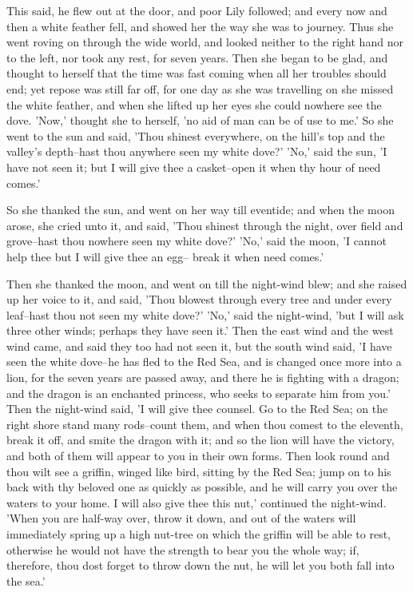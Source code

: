 \documentclass[12pt]{book}
\begin{document}
This said, he flew out at the door, and poor Lily followed; and every
now and then a white feather fell, and showed her the way she was to
journey. Thus she went roving on through the wide world, and looked
neither to the right hand nor to the left, nor took any rest, for
seven years. Then she began to be glad, and thought to herself that
the time was fast coming when all her troubles should end; yet repose
was still far off, for one day as she was travelling on she missed the
white feather, and when she lifted up her eyes she could nowhere see
the dove. 'Now,' thought she to herself, 'no aid of man can be of use
to me.' So she went to the sun and said, 'Thou shinest everywhere, on
the hill's top and the valley's depth--hast thou anywhere seen my
white dove?' 'No,' said the sun, 'I have not seen it; but I will give
thee a casket--open it when thy hour of need comes.'

So she thanked the sun, and went on her way till eventide; and when
the moon arose, she cried unto it, and said, 'Thou shinest through the
night, over field and grove--hast thou nowhere seen my white dove?'
'No,' said the moon, 'I cannot help thee but I will give thee an egg--
break it when need comes.'

Then she thanked the moon, and went on till the night-wind blew; and
she raised up her voice to it, and said, 'Thou blowest through every
tree and under every leaf--hast thou not seen my white dove?' 'No,'
said the night-wind, 'but I will ask three other winds; perhaps they
have seen it.' Then the east wind and the west wind came, and said
they too had not seen it, but the south wind said, 'I have seen the
white dove--he has fled to the Red Sea, and is changed once more into
a lion, for the seven years are passed away, and there he is fighting
with a dragon; and the dragon is an enchanted princess, who seeks to
separate him from you.' Then the night-wind said, 'I will give thee
counsel. Go to the Red Sea; on the right shore stand many rods--count
them, and when thou comest to the eleventh, break it off, and smite
the dragon with it; and so the lion will have the victory, and both of
them will appear to you in their own forms. Then look round and thou
wilt see a griffin, winged like bird, sitting by the Red Sea; jump on
to his back with thy beloved one as quickly as possible, and he will
carry you over the waters to your home. I will also give thee this
nut,' continued the night-wind. 'When you are half-way over, throw it
down, and out of the waters will immediately spring up a high nut-tree
on which the griffin will be able to rest, otherwise he would not have
the strength to bear you the whole way; if, therefore, thou dost
forget to throw down the nut, he will let you both fall into the sea.'
\end{document}
